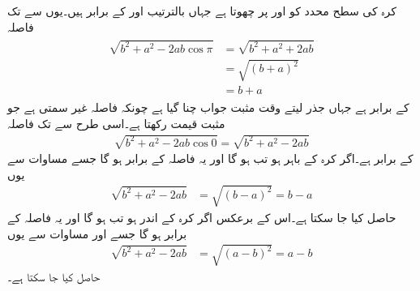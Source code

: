 کرہ کی سطح  محدد کو  اور   پر چھوتا ہے جہاں  بالترتیب  اور  کے برابر ہیں۔یوں  سے  تک فاصلہ
\begin{gather}
\begin{aligned}\label{مساوات_کولمب_کرہ_مثبت_محدد}
\sqrt{b^2+a^2-2 ab \cos \pi}&=\sqrt{b^2+a^2+2 ab}\\
&=\sqrt{(b+a)^2}\\
&=b+a
\end{aligned}
\end{gather}
کے برابر ہے جہاں جذر لیتے وقت مثبت جواب چنا گیا ہے چونکہ فاصلہ غیر سمتی ہے جو مثبت قیمت رکھتا ہے۔اسی طرح  سے  تک فاصلہ
\begin{align}\label{مساوات_کولمب_کرہ_مثبت_محدد_الف}
\sqrt{b^2+a^2-2 ab \cos 0}=\sqrt{b^2+a^2-2 ab}
\end{align}
کے برابر ہے۔اگر  کرہ کے باہر ہو تب  ہو گا اور یہ فاصلہ  کے برابر ہو گا جسے  مساوات  سے یوں
\begin{align}\label{مساوات_کولمب_کرہ_مثبت_محدد_ب}
\sqrt{b^2+a^2-2 ab}&=\sqrt{(b-a)^2}=b-a
\end{align}
حاصل کیا جا سکتا ہے۔اس کے برعکس اگر  کرہ کے اندر ہو تب  ہو گا اور یہ فاصلہ  کے برابر ہو گا جسے  اور مساوات  سے یوں
\begin{align}\label{مساوات_کولمب_کرہ_مثبت_محدد_پ}
\sqrt{b^2+a^2-2 ab}&=\sqrt{(a-b)^2}=a-b
\end{align}
حاصل کیا جا سکتا ہے۔

